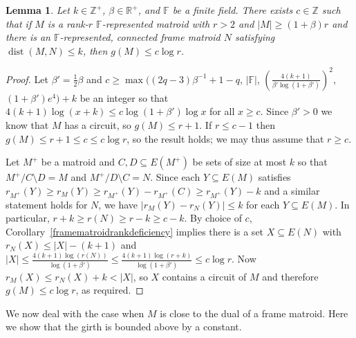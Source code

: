 \documentclass[12pt]{amsart}
\newtheorem{lemma}[theorem]{Lemma}
\theoremstyle{definition}
\newcommand{\bF}{\mathbb F}
\newcommand{\bR}{\mathbb R}
\newcommand{\bZ}{\mathbb Z}
\DeclareMathOperator{\dist}{dist}
\newcommand{\del}{\!\setminus\!}
\newcommand{\con}{/}
\begin{document}
  \begin{lemma}\label{nearframe}
    Let $k \in \bZ^+$, $\beta \in \bR^+$, and $\bF$ be a finite field. There exists $c \in \bZ$ such that if $M$ is a rank-$r$ $\bF$-represented matroid with $r > 2$ and $|M| \ge (1+ \beta)r$ and there is an $\bF$-represented, connected frame matroid $N$ satisfying $\dist(M,N) \le k$, then $g(M) \le c \log r$.
  \end{lemma}
  \begin{proof}
    Let $\beta' = \tfrac{1}{2}\beta$ and $c \ge \max\Big((2q-3)\beta^{-1}+1-q$, $|\bF|$, $\left(\tfrac{4(k+1)}{\beta'\log(1+\beta')}\right)^2$, $(1+\beta')e^4\Big)+k$ be an integer so that $4(k+1)\log(x+k) \le c \log(1+\beta')\log x$ for all $x \ge c$. Since $\beta' > 0$ we know that $M$ has a circuit, so $g(M) \le r+1$. If $r \le c-1$ then $g(M) \le r+1 \le c \le c \log r$, so the result holds; we may thus assume that $r \ge c$.
    
    Let $M^+$ be a matroid and $C,D \subseteq E(M^+)$ be sets of size at most $k$ so that $M^+ \con C \del D = M$ and $M^+ \con D \del C = N$. Since each $Y \subseteq E(M)$ satisfies $r_{M^+}(Y) \ge r_M(Y) \ge r_{M^+}(Y) - r_{M^+}(C) \ge r_{M^+}(Y) - k$ and a similar statement holds for $N$, we have  $|r_M(Y) - r_{N}(Y)| \le k$ for each $Y \subseteq E(M)$. In particular, $r+k \ge r(N) \ge r - k \ge c-k$. By choice of $c$, Corollary~\ref{framematroidrankdeficiency} implies there is a set $X \subseteq E(N)$ with $r_{N}(X) \le |X|-(k+1)$ and $|X| \le \frac{4(k+1)\log(r(N))}{\log(1+\beta')} \le \tfrac{4(k+1)\log(r+k)}{\log(1+\beta')} \le c \log r$. Now $r_M(X) \le r_{N}(X) + k < |X|$, so $X$ contains a circuit of $M$ and therefore $g(M) \le c \log r$, as required. 
  \end{proof}
  
  We now deal with the case when $M$ is close to the dual of a frame matroid. Here we show that the girth is bounded above by a constant.
  
\end{document}
